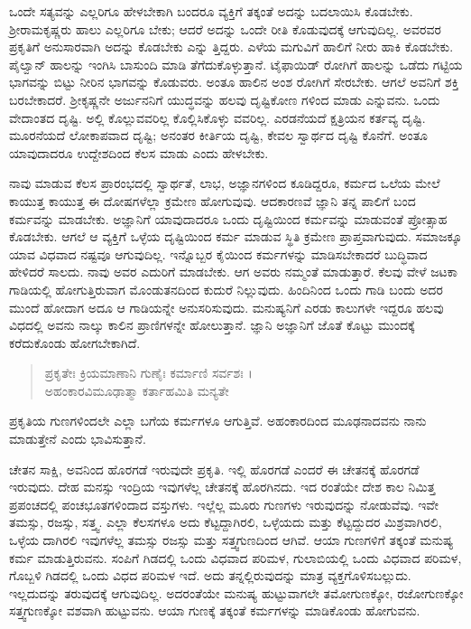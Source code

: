ಒಂದೇ ಸತ್ಯವನ್ನು ಎಲ್ಲರಿಗೂ ಹೇಳಬೇಕಾಗಿ ಬಂದರೂ ವ್ಯಕ್ತಿಗೆ ತಕ್ಕಂತೆ ಅದನ್ನು ಬದಲಾಯಿಸಿ ಕೊಡಬೇಕು. ಶ್ರೀರಾಮಕೃಷ್ಣರು ಹಾಲು ಎಲ್ಲರಿಗೂ ಬೇಕು; ಆದರೆ ಅದನ್ನು ಒಂದೇ ರೀತಿ ಕೊಡುವುದಕ್ಕೆ ಆಗುವುದಿಲ್ಲ. ಅವರವರ ಪ್ರಕೃತಿಗೆ ಅನುಸಾರವಾಗಿ ಅದನ್ನು ಕೊಡಬೇಕು ಎನ್ನು ತ್ತಿದ್ದರು. ಎಳೆಯ ಮಗುವಿಗೆ ಹಾಲಿಗೆ ನೀರು ಹಾಕಿ ಕೊಡಬೇಕು. ಪೈಲ್ವಾನ್ ಹಾಲನ್ನು ಇಂಗಿಸಿ ಬಾಸುಂದಿ ಮಾಡಿ ತೆಗೆದುಕೊಳ್ಳುತ್ತಾನೆ. ಟೈಫಾಯಿಡ್ ರೋಗಿಗೆ ಹಾಲನ್ನು ಒಡೆದು ಗಟ್ಟಿಯ ಭಾಗವನ್ನು ಬಿಟ್ಟು ನೀರಿನ ಭಾಗವನ್ನು ಕೊಡುವರು. ಅಂತೂ ಹಾಲಿನ ಅಂಶ ರೋಗಿಗೆ ಸೇರಬೇಕು. ಆಗಲೆ ಅವನಿಗೆ ಶಕ್ತಿ ಬರಬೇಕಾದರೆ. ಶ್ರೀಕೃಷ್ಣನೇ ಅರ್ಜುನನಿಗೆ ಯುದ್ಧವನ್ನು ಹಲವು ದೃಷ್ಟಿಕೋಣ ಗಳಿಂದ ಮಾಡು ಎನ್ನುವನು. ಒಂದು ವೇದಾಂತದ ದೃಷ್ಟಿ. ಅಲ್ಲಿ ಕೊಲ್ಲುವವರಿಲ್ಲ ಕೊಲ್ಲಿಸಿಕೊಳ್ಳು ವವರಿಲ್ಲ. ಎರಡನೆಯದೆ ಕ್ಷತ್ರಿಯನ ಕರ್ತವ್ಯ ದೃಷ್ಟಿ. ಮೂರನೆಯದೆ ಲೋಕಾಪವಾದ ದೃಷ್ಟಿ; ಅನಂತರ ಕೀರ್ತಿಯ ದೃಷ್ಟಿ, ಕೇವಲ ಸ್ವಾರ್ಥದ ದೃಷ್ಟಿ ಕೊನೆಗೆ. ಅಂತೂ ಯಾವುದಾದರೂ ಉದ್ದೇಶದಿಂದ ಕೆಲಸ ಮಾಡು ಎಂದು ಹೇಳಬೇಕು.

ನಾವು ಮಾಡುವ ಕೆಲಸ ಪ್ರಾರಂಭದಲ್ಲಿ ಸ್ವಾರ್ಥತೆ, ಲಾಭ, ಅಜ್ಞಾನಗಳಿಂದ ಕೂಡಿದ್ದರೂ, ಕರ್ಮದ ಒಲೆಯ ಮೇಲೆ ಕಾಯುತ್ತ ಕಾಯುತ್ತ ಈ ದೋಷಗಳೆಲ್ಲಾ ಕ್ರಮೇಣ ಹೋಗುವುವು. ಆದಕಾರಣವೆ ಜ್ಞಾನಿ ತನ್ನ ಪಾಲಿಗೆ ಬಂದ ಕರ್ಮವನ್ನು ಮಾಡಬೇಕು. ಅಜ್ಞಾನಿಗೆ ಯಾವುದಾದರೂ ಒಂದು ದೃಷ್ಟಿಯಿಂದ ಕರ್ಮವನ್ನು ಮಾಡುವಂತೆ ಪ್ರೋತ್ಸಾಹ ಕೊಡಬೇಕು. ಆಗಲೆ ಆ ವ್ಯಕ್ತಿಗೆ ಒಳ್ಳೆಯ ದೃಷ್ಟಿಯಿಂದ ಕರ್ಮ ಮಾಡುವ ಸ್ಥಿತಿ ಕ್ರಮೇಣ ಪ್ರಾಪ್ತವಾಗುವುದು. ಸಮಾಜಕ್ಕೂ ಯಾವ ವಿಧವಾದ ನಷ್ಟವೂ ಆಗುವುದಿಲ್ಲ. ಇನ್ನೊಬ್ಬರ ಕೈಯಿಂದ ಕರ್ಮಗಳನ್ನು ಮಾಡಿಸಬೇಕಾದರೆ ಬುದ್ಧಿವಾದ ಹೇಳಿದರೆ ಸಾಲದು. ನಾವು ಅವರ ಎದುರಿಗೆ ಮಾಡಬೇಕು. ಆಗ ಅವರು ನಮ್ಮಂತೆ ಮಾಡುತ್ತಾರೆ. ಕೆಲವು ವೇಳೆ ಜಟಕಾ ಗಾಡಿಯಲ್ಲಿ ಹೋಗುತ್ತಿರುವಾಗ ಮೊಂಡುತನದಿಂದ ಕುದುರೆ ನಿಲ್ಲುವುದು. ಹಿಂದಿನಿಂದ ಒಂದು ಗಾಡಿ ಬಂದು ಅದರ ಮುಂದೆ ಹೋದಾಗ ಅದೂ ಆ ಗಾಡಿಯನ್ನೇ ಅನುಸರಿಸುವುದು. ಮನುಷ್ಯನಿಗೆ ಎರಡು ಕಾಲುಗಳೇ ಇದ್ದರೂ ಹಲವು ವಿಧದಲ್ಲಿ ಅವನು ನಾಲ್ಕು ಕಾಲಿನ ಪ್ರಾಣಿಗಳನ್ನೇ ಹೋಲುತ್ತಾನೆ. ಜ್ಞಾನಿ ಅಜ್ಞಾನಿಗೆ ಜೊತೆ ಕೊಟ್ಟು ಮುಂದಕ್ಕೆ ಕರೆದುಕೊಂಡು ಹೋಗಬೇಕಾಗಿದೆ.

\begin{verse}
ಪ್ರಕೃತೇಃ ಕ್ರಿಯಮಾಣಾನಿ ಗುಣೈಃ ಕರ್ಮಾಣಿ ಸರ್ವಶಃ ।\\ಅಹಂಕಾರವಿಮೂಢಾತ್ಮಾ ಕರ್ತಾಹಮಿತಿ ಮನ್ಯತೇ 
\end{verse}

{\small ಪ್ರಕೃತಿಯ ಗುಣಗಳಿಂದಲೇ ಎಲ್ಲಾ ಬಗೆಯ ಕರ್ಮಗಳೂ ಆಗುತ್ತಿವೆ. ಅಹಂಕಾರದಿಂದ ಮೂಢನಾದವನು ನಾನು ಮಾಡುತ್ತೇನೆ ಎಂದು ಭಾವಿಸುತ್ತಾನೆ.}

ಚೇತನ ಸಾಕ್ಷಿ, ಅವನಿಂದ ಹೊರಗಡೆ ಇರುವುದೇ ಪ್ರಕೃತಿ. ಇಲ್ಲಿ ಹೊರಗಡೆ ಎಂದರೆ ಈ ಚೇತನಕ್ಕೆ ಹೊರಗಡೆ ಇರುವುದು. ದೇಹ ಮನಸ್ಸು ಇಂದ್ರಿಯ ಇವುಗಳೆಲ್ಲ ಚೇತನಕ್ಕೆ ಹೊರಗಿನದು. ಇದ ರಂತೆಯೇ ದೇಶ ಕಾಲ ನಿಮಿತ್ತ ಪ್ರಪಂಚದಲ್ಲಿ ಪಂಚಭೂತಗಳಿಂದಾದ ವಸ್ತುಗಳು. ಇಲ್ಲೆಲ್ಲ ಮೂರು ಗುಣಗಳು ಇರುವುದನ್ನು ನೋಡುವೆವು. ಇವೇ ತಮಸ್ಸು, ರಜಸ್ಸು, ಸತ್ತ್ವ. ಎಲ್ಲಾ ಕೆಲಸಗಳೂ ಅದು ಕೆಟ್ಟದ್ದಾಗಿರಲಿ, ಒಳ್ಳೆಯದು ಮತ್ತು ಕೆಟ್ಟದ್ದುದರ ಮಿಶ್ರವಾಗಿರಲಿ, ಒಳ್ಳೆಯ ದಾಗಿರಲಿ ಇವುಗಳೆಲ್ಲ ತಮಸ್ಸು ರಜಸ್ಸು ಮತ್ತು ಸತ್ತ್ವಗುಣದಿಂದ ಆಗಿವೆ. ಆಯಾ ಗುಣಗಳಿಗೆ ತಕ್ಕಂತೆ ಮನುಷ್ಯ ಕರ್ಮ ಮಾಡುತ್ತಿರುವನು. ಸಂಪಿಗೆ ಗಿಡದಲ್ಲಿ ಒಂದು ವಿಧವಾದ ಪರಿಮಳ, ಗುಲಾಬಿಯಲ್ಲಿ ಒಂದು ವಿಧವಾದ ಪರಿಮಳ, ಗೊಬ್ಬಳಿ ಗಿಡದಲ್ಲಿ ಒಂದು ವಿಧದ ಪರಿಮಳ ಇದೆ. ಅದು ತನ್ನಲ್ಲಿರುವುದನ್ನು ಮಾತ್ರ ವ್ಯಕ್ತಗೊಳಿಸಬಲ್ಲುದು. ಇಲ್ಲದುದನ್ನು ತರುವುದಕ್ಕೆ ಆಗುವುದಿಲ್ಲ. ಅದರಂತೆಯೇ ಮನುಷ್ಯ ಹುಟ್ಟುವಾಗಲೇ ತಮೋಗುಣಕ್ಕೋ, ರಜೋಗುಣಕ್ಕೋ ಸತ್ತ್ವಗುಣಕ್ಕೋ ವಶವಾಗಿ ಹುಟ್ಟುವನು. ಆಯಾ ಗುಣಕ್ಕೆ ತಕ್ಕಂತೆ ಕರ್ಮಗಳನ್ನು ಮಾಡಿಕೊಂಡು ಹೋಗುವನು.

